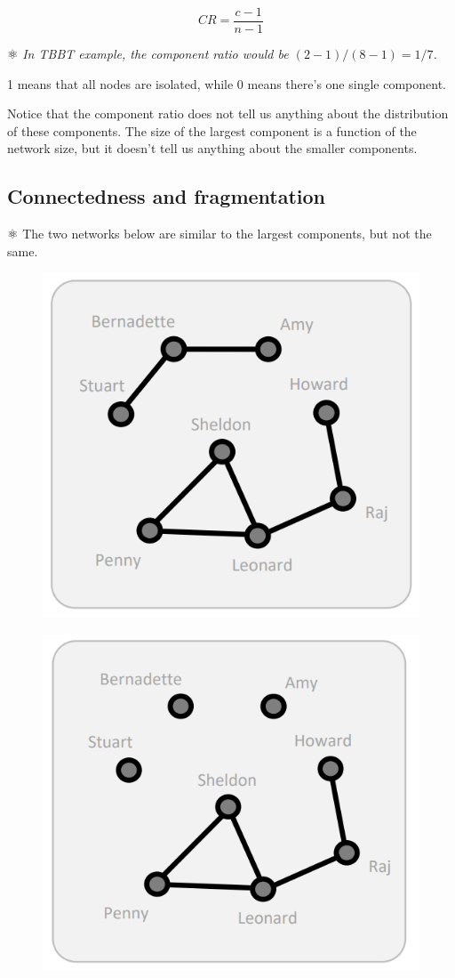 \documentclass[
  notitlepage,
  onecolumn,
  openany]{book}
\begin{document}
\[
CR = \frac{c-1}{n-1}
\]

⚛️ \emph{In TBBT example, the component ratio would be \((2-1)/(8-1) = 1/7\).}

1 means that all nodes are isolated, while 0 means there's one single component.

Notice that the component ratio does not tell us anything about the distribution of these components. The size of the largest component is a function of the network size, but it doesn't tell us anything about the smaller components.

\hypertarget{connectedness-and-fragmentation}{%
\subsection{Connectedness and fragmentation}\label{connectedness-and-fragmentation}}

⚛️ The two networks below are similar to the largest components, but not the same.

\begin{figure}[h!]

{\centering \includegraphics[width=0.5\linewidth]{images/03-Cohesion measures/Untitled 2} 

}

\end{figure}

\begin{figure}[h!]

{\centering \includegraphics[width=0.5\linewidth]{images/03-Cohesion measures/Untitled 3} 

}

\end{figure}
\end{document}

